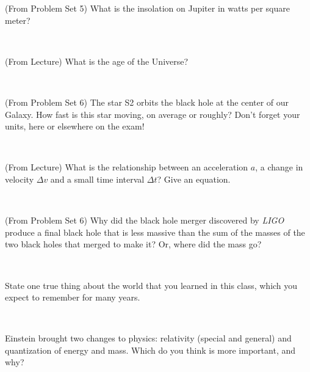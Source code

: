 \documentclass[12pt, letterpaper]{article}
\begin{document}
\begin{problem}
(From Problem Set 5)
What is the insolation on Jupiter in watts per square meter?
\end{problem}

\vfill ~

\clearpage

\begin{problem}
(From Lecture)
What is the age of the Universe?
\end{problem}

\vfill ~

\begin{problem}
(From Problem Set 6)
The star S2 orbits the black hole at the center of our Galaxy.
How fast is this star moving, on average or roughly?
Don't forget your units, here or elsewhere on the exam!
\end{problem}

\vfill ~

\begin{problem}
(From Lecture)
What is the relationship between an acceleration $a$, a change in velocity $\Delta v$ and a small time interval $\Delta t$? Give an equation.
\end{problem}

\vfill ~

\begin{problem}
(From Problem Set 6)
Why did the black hole merger discovered by \textsl{LIGO} produce a final black hole that is less massive than the sum of the masses of the two black holes that merged to make it? Or, where did the mass go?
\end{problem}

\vfill ~

\clearpage

\begin{problem}
State one true thing about the world that you learned in this class,
which you expect to remember for many years.
\end{problem}

\vfill ~

\begin{problem}
Einstein brought two changes to physics: relativity (special and general) and
quantization of energy and mass. Which do you think is more important, and why?
\end{problem}

\vfill ~

~

\vfill ~

~

\vfill ~
\end{document}
